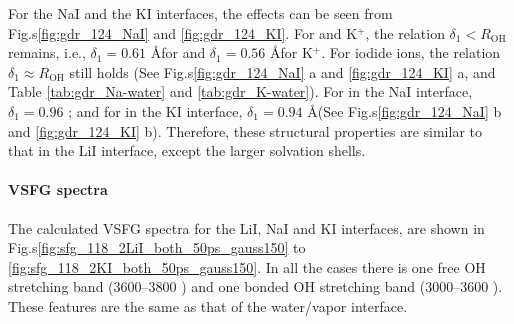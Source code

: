 For the NaI and the KI interfaces, the effects can be seen from Fig.s\thinspace\ref{fig:gdr_124_NaI} and \ref{fig:gdr_124_KI}. For \Na and K$^+$, 
the relation $\delta_1 < R_{\text{OH}}$ remains,
i.e., $\delta_1 = 0.61$ \AA for \Na and $\delta_1 = 0.56$ \AA  for K$^+$.
For iodide ions, the relation $\delta_1 \approx R_{\text{OH}}$ still holds (See Fig.s\thinspace\ref{fig:gdr_124_NaI} a and \ref{fig:gdr_124_KI} a,
and Table \ref{tab:gdr_Na-water} and \ref{tab:gdr_K-water}). For \I in the NaI interface, $\delta_1 = 0.96$ \A; 
and for \I in the KI interface, $\delta_1 = 0.94$ \AA (See Fig.s\thinspace\ref{fig:gdr_124_NaI} b and \ref{fig:gdr_124_KI} b).
Therefore, these structural properties are similar to that in the LiI interface, except the larger solvation shells.

\paragraph{VSFG spectra}
The calculated VSFG spectra for the LiI, NaI and KI interfaces, are shown in Fig.s\thinspace\ref{fig:sfg_118_2LiI_both_50ps_gauss150} to \ref{fig:sfg_118_2KI_both_50ps_gauss150}. 
In all the cases there is one free OH stretching band (3600--3800 \centimeter) and one bonded OH stretching band (3000--3600 \centimeter).
These features are the same as that of the water/vapor interface.
